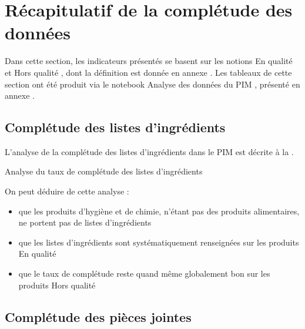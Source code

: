         \section{Récapitulatif de la complétude des données}

            Dans cette section, les indicateurs présentés se basent sur les notions \og En qualité \fg et \og Hors qualité \fg, dont la définition est donnée en annexe . 
            Les tableaux de cette section ont été produit via le notebook \og Analyse des données du PIM \fg, présenté en annexe .

            \subsection{Complétude des listes d'ingrédients}

            L'analyse de la complétude des listes d'ingrédients dans le PIM est décrite à la .

            \begin{table}[htbp]
                \begin{center}
                {\scriptsize
                
                }
                \caption{Analyse du taux de complétude des listes d'ingrédients}
                \label{tbl:ingredients_counts}
                \end{center}
            \end{table}        

            On peut déduire de cette analyse : 
            \begin{itemize}
                \item que les produits d'hygiène et de chimie, n'étant pas des produits alimentaires, ne portent pas de listes d'ingrédients
                \item que les listes d'ingrédients sont systématiquement renseignées sur les produits \og En qualité \fg
                \item que le taux de complétude reste quand même globalement bon sur les produits \og Hors qualité \fg
            \end{itemize}

            \subsection{Complétude des pièces jointes}


